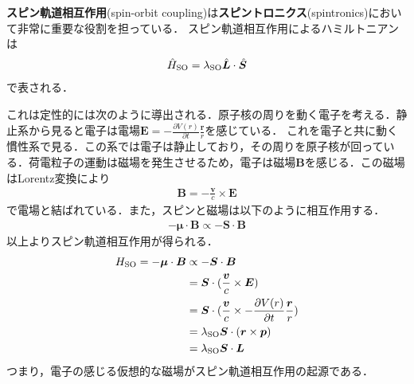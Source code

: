 \documentclass{report}
\begin{document}
  \textbf{スピン軌道相互作用}(spin-orbit coupling)は\textbf{スピントロニクス}(spintronics)において非常に重要な役割を担っている．
  スピン軌道相互作用によるハミルトニアンは
  \begin{align}
    \hat{H}_{\mathrm{SO}} = \lambda_{\mathrm{SO}} \hat{\bm{L}} \cdot \hat{\bm{S}}
  \end{align}
  で表される．

  これは定性的には次のように導出される．原子核の周りを動く電子を考える．静止系から見ると電子は電場$\bm{E} = -\frac{\partial V(r)}{\partial t}\frac{\bm{r}}{r}$を感じている．
  これを電子と共に動く慣性系で見る．この系では電子は静止しており，その周りを原子核が回っている．荷電粒子の運動は磁場を発生させるため，電子は磁場$\bm{B}$を感じる．この磁場はLorentz変換により
  \begin{align}
    \bm{B} = -\frac{\bm{v}}{c} \times \bm{E}
  \end{align}
  で電場と結ばれている．また，スピンと磁場は以下のように相互作用する．
  \begin{align}
    -\bm{\mu}\cdot\bm{B} \propto -\bm{S}\cdot\bm{B}
  \end{align}
  以上よりスピン軌道相互作用が得られる．
  \begin{align}
    H_{\mathrm{SO}} = -\bm{\mu}\cdot\bm{B} &\propto -\bm{S}\cdot\bm{B}\\
    &= \bm{S} \cdot (\frac{\bm{v}}{c} \times \bm{E})\\
    &= \bm{S} \cdot(\frac{\bm{v}}{c} \times -\frac{\partial V(r)}{\partial t}\frac{\bm{r}}{r})\\
    &= \lambda_{\mathrm{SO}} \bm{S}\cdot(\bm{r} \times \bm{p})\\
    &= \lambda_{\mathrm{SO}} \bm{S} \cdot \bm{L}
  \end{align}
  つまり，電子の感じる仮想的な磁場がスピン軌道相互作用の起源である．
\end{document}
